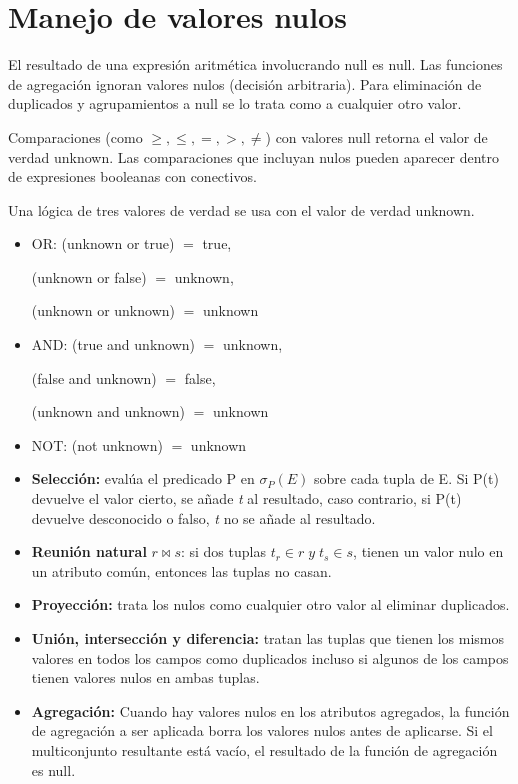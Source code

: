 \documentclass[12pt,a4paper]{report}
\newcounter{neq}
\begin{document}
	\section{Manejo de valores nulos}
		\par El resultado de una expresión aritmética involucrando null es null. Las funciones de agregación ignoran valores nulos (decisión arbitraria). Para eliminación de duplicados y agrupamientos a null se lo trata como a cualquier otro valor.
		\par Comparaciones (como $\geq, \leq , =, >, \neq$) con valores null retorna el valor de verdad unknown. Las comparaciones que incluyan nulos pueden aparecer dentro de expresiones booleanas con conectivos.
		\par Una lógica de tres valores de verdad se usa con el valor de verdad unknown.
		\begin{itemize}
			\item OR: (unknown or true) $=$ true,
			\par (unknown or false) $=$ unknown,
			\par (unknown or unknown) $=$ unknown
			\item AND: (true and unknown) $=$ unknown, 
			\par (false and unknown) $=$ false, 
			\par (unknown and unknown) $=$ unknown
			\item NOT: (not unknown) $=$ unknown
		\end{itemize}

		\begin{itemize}
			\item \textbf{Selección:} evalúa el predicado P en $\sigma_{P}(E)$ sobre cada tupla de E. Si P(t) devuelve el valor cierto, se añade \textit{t} al resultado, caso contrario, si P(t) devuelve desconocido o falso, \textit{t} no se añade al resultado.
			\item \textbf{Reunión natural} $r \bowtie s$: si dos tuplas $t_{r} \in r \; y \; t_{s} \in s$, tienen un valor nulo en un atributo común, entonces las tuplas no casan.
			\item \textbf{Proyección:} trata los nulos como cualquier otro valor al eliminar duplicados.
			\item \textbf{Unión, intersección y diferencia:} tratan las tuplas que tienen los mismos valores en todos los campos como duplicados incluso si algunos de los campos tienen valores nulos en ambas tuplas.
			\item \textbf{Agregación:} Cuando hay valores nulos en los atributos agregados, la función de agregación a ser aplicada borra los valores nulos antes de aplicarse. Si el multiconjunto resultante está vacío, el resultado de la función de agregación es null.
		\end{itemize}
\end{document}

